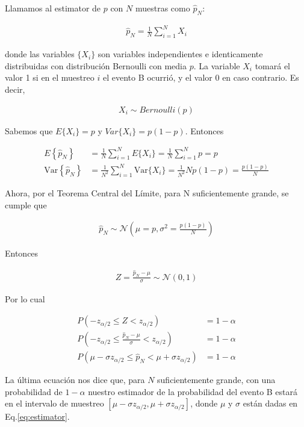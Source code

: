 \documentclass[12pt]{article}
\begin{document}
Llamamos al estimator de $p$ con $N$ muestras como $\hat{p}_N$:

\begin{align*}
    \hat{p}_N=\frac{1}{N}\sum_{i=1}^NX_i
\end{align*}

\noindent donde las variables $\{X_i\}$ son variables independientes e
identicamente distribuidas con distribución Bernoulli con media $p$. La
variable $X_i$ tomará el valor 1 si en el muestreo $i$ el evento B ocurrió, y
el valor 0 en caso contrario. Es decir,

\begin{align*}
    X_i\sim Bernoulli(p)
\end{align*}

Sabemos que $E\{X_i\}=p$ y $Var\{X_i\}=p(1-p)$. Entonces

\begin{align*}
    E\left\{\hat{p}_N\right\}&=\frac{1}{N}\sum_{i=1}^NE\{X_i\}=\frac{1}{N}\sum_{i=1}^Np=p\\
    \text{Var}\left\{\hat{p}_N\right\}&=\frac{1}{N^2}\sum_{i=1}^N\text{Var}\{X_i\}=\frac{1}{N^2}Np(1-p)=\frac{p(1-p)}{N}
\end{align*}

Ahora, por el Teorema Central del Límite, para N suficientemente grande, se
cumple que

\begin{align}
    \hat{p}_N\sim\mathcal{N}\left(\mu=p,\sigma^2=\frac{p(1-p)}{N}\right)\label{eq:estimator}
\end{align}

Entonces

\begin{align*}
    Z=\frac{\hat{p}_N-\mu}{\sigma}\sim\mathcal{N}(0, 1)
\end{align*}

Por lo cual

\begin{align*}
    P(-z_{\alpha/2}\le Z<z_{\alpha/2})&=1-\alpha\\
    P(-z_{\alpha/2}\le\frac{\hat{p}_N-\mu}{\sigma}<z_{\alpha/2})&=1-\alpha\\
    P(\mu-\sigma z_{\alpha/2}\le\hat{p}_N<\mu+\sigma z_{\alpha/2})&=1-\alpha
\end{align*}

La última ecuación nos dice que, para $N$ suficientemente grande, con una
probabilidad de $1-\alpha$ nuestro estimador de la probabilidad del evento B
estará en el intervalo de muestreo $[\mu-\sigma z_{\alpha/2},\mu+\sigma
z_{\alpha/2}]$, donde $\mu$ y $\sigma$ están dadas en Eq.\ref{eq:estimator}.
\end{document}
